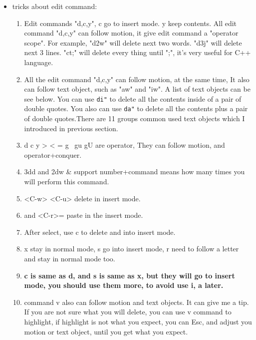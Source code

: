 \documentclass[a4paper,12pt,twoside]{book}
\begin{document}
\begin{itemize}
\begin{center}
\begin{tabular}{p{}|p{}|p{}}
				\end{tabular}
	\end{center}
	
\item tricks about edit command: 
\begin{enumerate}

				\item  Edit commands "d,c,y", c go to insert mode. y keep contents. All edit command "d,c,y" can follow motion, it give edit command a "operator scope". For example, "d2w" will delete next two words. "d3j" will delete next 3 lines. "ct;" will delete every thing until ";", it's very useful for C++ language. 

				\item All the edit command "d,c,y" can follow motion, at the same time, It also can follow text object, such as "aw" and "iw". A list of text objects can be see below.  You can use \verb=di"= to delete all the contents inside of a pair of double quotes. You also can use \verb=da"= to delete all the contents plus a pair of double quotes.There are 11 groups common used text objects which I introduced in previous section. 

				\item d c y > < = g~ gu gU are operator, They can follow motion, and operator+conquer.

			\item 3dd and 2dw   \& support number+command means how many times you will perform this command.

			\item <C-h> <C-w> <C-u> delete in insert mode.
					
				\item <C-r> and <C-r>= paste in the insert mode.
					
				\item After select, use c to delete and into insert mode.

				\item x stay in normal mode, s go into insert mode, r need to follow a letter and stay in normal mode too.
				
				\item \textbf{c is same as d, and s is same as x, but they will go to insert mode, you should use them more, to avoid use i, a later.}  
				
						
				\item command v also can follow motion and text objects. It can give me a tip. If you are not sure what you will delete, you can use v command to highlight, if highlight is not what you expect, you can Esc, and adjust you motion or text object, until you get what you expect. 


\end{enumerate}
\end{itemize}
\end{document}
